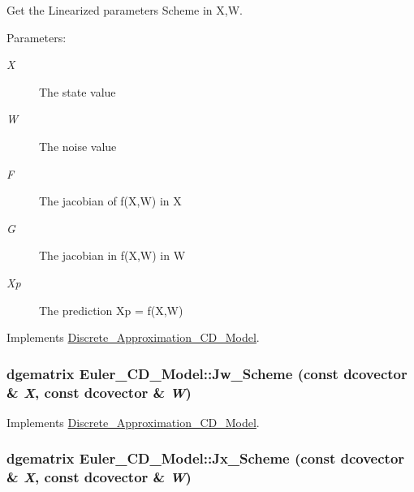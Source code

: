 Get the Linearized parameters Scheme in X,W. 

\begin{Desc}
\item[Parameters:]
\begin{description}
\item[{\em X}]The state value \item[{\em W}]The noise value \item[{\em F}]The jacobian of f(X,W) in X \item[{\em G}]The jacobian in f(X,W) in W \item[{\em Xp}]The prediction Xp = f(X,W) \end{description}
\end{Desc}


Implements \hyperlink{class_discrete___approximation___c_d___model_0a486fada10e6f5569d186edc7b32110}{Discrete\_\-Approximation\_\-CD\_\-Model}.\hypertarget{class_euler___c_d___model_d4b9cef601904d1e86c2f3a5f9e01b06}{
\subsubsection[{Jw\_\-Scheme}]{\setlength{\rightskip}{0pt plus 5cm}dgematrix Euler\_\-CD\_\-Model::Jw\_\-Scheme (const dcovector \& {\em X}, \/  const dcovector \& {\em W})}}
\label{class_euler___c_d___model_d4b9cef601904d1e86c2f3a5f9e01b06}




Implements \hyperlink{class_discrete___approximation___c_d___model_c7496999409a3f05125ceb7fe85e85ab}{Discrete\_\-Approximation\_\-CD\_\-Model}.\hypertarget{class_euler___c_d___model_31ea181a55cb1b348bd483f5fe077c50}{
\subsubsection[{Jx\_\-Scheme}]{\setlength{\rightskip}{0pt plus 5cm}dgematrix Euler\_\-CD\_\-Model::Jx\_\-Scheme (const dcovector \& {\em X}, \/  const dcovector \& {\em W})}}
\label{class_euler___c_d___model_31ea181a55cb1b348bd483f5fe077c50}




